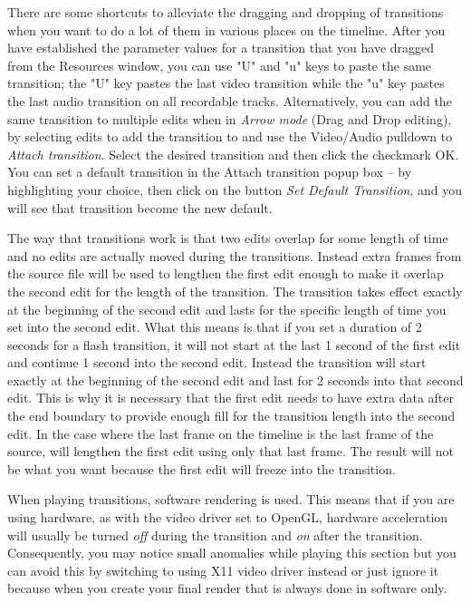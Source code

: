 There are some shortcuts to alleviate the dragging and dropping of transitions when you want to do a lot of them in various places on the timeline. After you have established the parameter values for a transition that you have dragged from the Resources window, you can use "U" and "u" keys to paste the same transition;
the "U" key pastes the last video transition while the "u" key pastes the last audio transition on all recordable tracks. 
Alternatively, you can add the same transition to multiple edits when in \textit{Arrow mode} (Drag and Drop editing), by selecting edits to add the transition to and use the Video/Audio pulldown to \textit{Attach transition}. Select the desired transition and then click the checkmark OK. You can set a default transition in the Attach transition popup box -- by highlighting your choice, then click on the button \textit{Set Default Transition}, and you will see that transition become the new default.

The way that transitions work is that two edits overlap for some length of time and no edits are actually moved during the transitions.
Instead extra frames from the source file will be used to lengthen the first edit enough to make it overlap the second edit for the length of the transition. The transition takes effect exactly at the beginning of the second edit and lasts for the specific length of time you set into the second edit. 
What this means is that if you set a duration of 2 seconds for a flash transition, it will not start at the last 1 second of the first edit and continue 1 second into the second edit. Instead the transition will start exactly at the beginning of the second edit and last for 2 seconds into that second edit. 
This is why it is necessary that the first edit needs to have extra data after the end boundary to provide enough fill for the transition length into the second edit.
In the case where the last frame on the timeline is the last frame of the source, \CGG{} will lengthen the first edit using only that last frame.  The result will not be what you want because the first edit will freeze into the transition.

When playing transitions, software rendering is used.  This means that if you are using hardware, as with the video driver set to OpenGL, hardware acceleration will usually be turned \textit{off} during the transition and \textit{on} after the transition. Consequently, you may notice small anomalies while playing this section but you can avoid this by switching to using X11 video driver instead or just ignore it because when you create your final render that is always done in software only.
    
